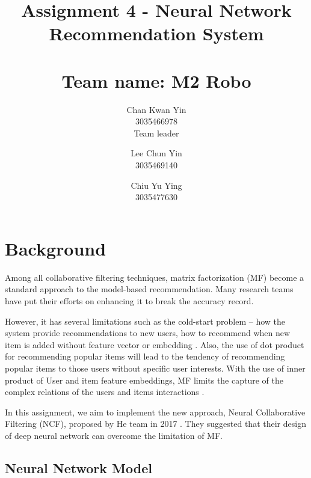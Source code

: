 \documentclass[final]{cvpr}
\begin{document}
\title{
	Assignment 4 - Neural Network Recommendation System \\~\\
	\large{Team name: M2 Robo}
}

\author{
	Chan Kwan Yin\\
	3035466978 \\
	Team leader

	\and

	Lee Chun Yin\\
	3035469140\\

	\and

	Chiu Yu Ying\\
	3035477630
}

\maketitle

\clearpage

\section{Background}

Among all collaborative filtering techniques, matrix factorization (MF) become a standard approach to the model-based recommendation. Many research teams have put their efforts on enhancing it to break the accuracy record. 

However, it has several limitations such as the cold-start problem -- how the system provide recommendations to new users, how to recommend when new item is added without feature vector or embedding \cite{FMF}. Also, the use of dot product for recommending popular items will lead to the tendency of recommending popular items to those users without specific user interests. With the use of inner product of User and item feature embeddings, MF limits the capture of the complex relations  of the users and items interactions \cite{NeuralCF}.

In this assignment, we aim to implement the new approach, Neural Collaborative Filtering (NCF), proposed by He team in 2017 \cite{NeuralCF}. They suggested that their design of deep neural network can overcome the limitation of MF.

\subsection{Neural Network Model}
\end{document}
